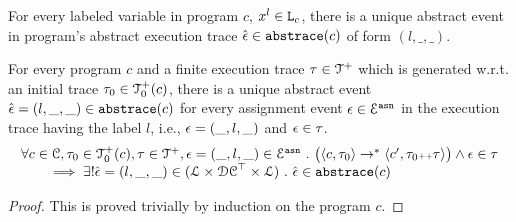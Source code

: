   For every labeled variable in program $c$, $x^l \in \mathtt{L}_c$, there is a unique abstract event in program's abstract execution trace $\hat{\mathtt{\epsilon}{}} \in \mathtt{abs}{\mathtt{trace}}(c)$ of form $(l, \_, \_)$. 
  \begin{lemma}
  For every program $c$ and
  a finite execution trace $\mathtt{\tau} \in \mathcal{T}^{+}$ which is generated w.r.t.
  an initial trace $\mathtt{\tau}_0 \in \mathcal{T}^{+}_0(c)$,
  there is a unique abstract event $\hat{\mathtt{\epsilon}{}} = (l, \_, \_) \in \mathtt{abs}{\mathtt{trace}}(c)$ 
  for every assignment event $\mathtt{\epsilon} \in \mathcal{E}^{\mathtt{{asn}}}$ in the
  execution trace having the label $l$, i.e., $\mathtt{\epsilon} = (\_, l, \_)$ and $\mathtt{\epsilon} \in \mathtt{\tau}$.
  \[
    \begin{array}{l}
    \forall c \in \mathcal{C}, \mathtt{\tau}_0 \in \mathcal{T}^{+}_0(c), \mathtt{\tau} \in \mathcal{T}^{+} ,  \mathtt{\epsilon} = (\_, l, \_) \in \mathcal{E}^{\mathtt{{asn}}} ~.~
    \big(
      \langle {c}, \mathtt{\tau}_0 \rangle \to^{*} \langle c', \mathtt{\tau}_0 {\scriptscriptstyle ++} \mathtt{\tau} \rangle 
    \big)
    \land \mathtt{\epsilon} \in \mathtt{\tau} 
    \\
    \qquad \implies \exists ! \hat{\mathtt{\epsilon}{}} = (l, \_, \_) \in (\mathcal{L}\times \mathcal{DC}^{\top} \times \mathcal{L}) ~.~ 
    \hat{\mathtt{\epsilon}{}} \in \mathtt{abs}{\mathtt{trace}}(c)
    \end{array}
  \]
  \end{lemma}
  \begin{proof}
    This is proved trivially by induction on the program $c$.
  \end{proof}